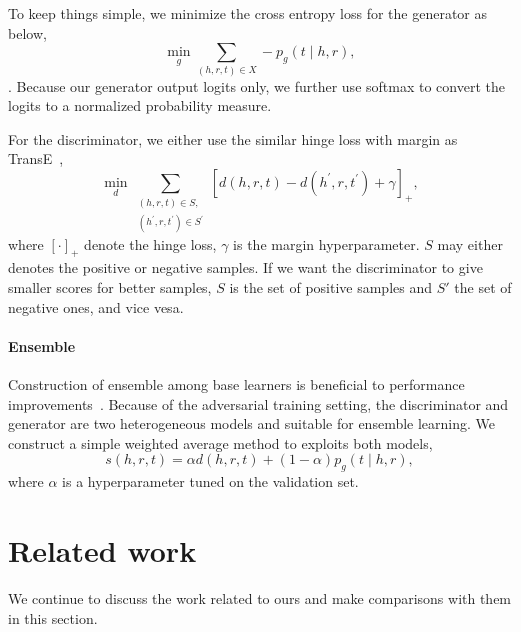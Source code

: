 \documentclass[twocolumn,a4paper,10pt,preprint,3p]{elsarticle}
\begin{document}
To keep things simple, we minimize the cross entropy loss for the generator as below,
\begin{equation}
    \min_g \sum_{(h, r, t)\in X} -p_g(t \mid h, r), \label{eq:g_pretrain}
\end{equation}.
Because our generator output logits only, we further use softmax to convert the logits to a normalized probability measure.

For the discriminator, we either use the similar hinge loss with margin as TransE~\cite{TransE2013},
\begin{equation}
    \min_d \sum_{\substack{(h, r, t)\in S,\\ (h^\prime, r, t^\prime)\in S^\prime }}
        {[ d(h, r, t) - d(h^\prime, r, t^\prime) + \gamma ]}_+, \label{eq:d_pretrain}
\end{equation}
where ${[\cdot]}_+$ denote the hinge loss, $\gamma$ is the margin hyperparameter. $S$ may either denotes the positive or negative samples. If we want the discriminator to give smaller scores for better samples, $S$ is the set of positive samples and $S'$ the set of negative ones, and vice vesa.

\paragraph{Ensemble} Construction of ensemble among base learners is beneficial to performance improvements~\cite{dietterich2000ensemble}. Because of the adversarial training setting, the discriminator and generator are two heterogeneous models and suitable for ensemble learning. We construct a simple weighted average method to exploits both models,
\begin{equation}
    s(h, r, t) = \alpha d(h, r, t) + (1 - \alpha) p_g(t \mid h, r), \label{eq:weighted-ensemble}
\end{equation}
where $\alpha$ is a hyperparameter tuned on the validation set.


\section{Related work}

We continue to discuss the work related to ours and make comparisons with them in this section.
\end{document}
